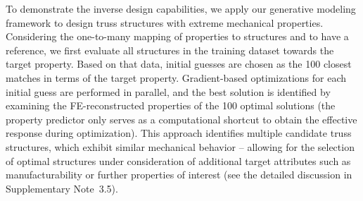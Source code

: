 \documentclass[fleqn,10pt]{wlscirep}
\begin{document}
To demonstrate the inverse design capabilities, we apply our generative modeling framework to design truss structures with extreme mechanical properties. Considering the one-to-many mapping of properties to structures and to have a reference, we first evaluate all structures in the training dataset towards the target property. Based on that data, initial guesses are chosen as the 100 closest matches in terms of the target property. Gradient-based optimizations for each initial guess are performed in parallel, and the best solution is identified by examining the FE-reconstructed properties of the 100 optimal solutions (the property predictor only serves as a computational shortcut to obtain the effective response during optimization). This approach identifies multiple candidate truss structures, which exhibit similar mechanical behavior -- allowing for the selection of optimal structures under consideration of additional target attributes such as manufacturability or further properties of interest (see the detailed discussion in Supplementary Note~3.5).
\end{document}
